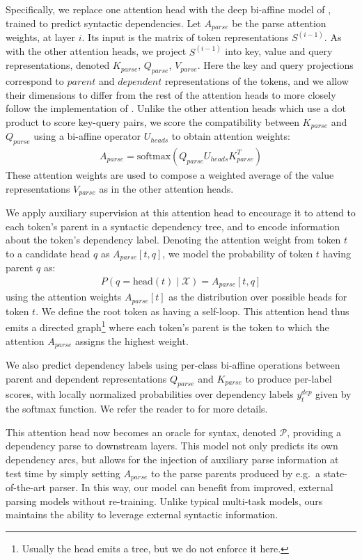 \documentclass[11pt,a4paper]{article}
\begin{document}
Specifically, we replace one attention head with the deep bi-affine model of \citet{dozat2017deep}, trained to predict syntactic dependencies. Let $A_{parse}$ be the parse attention weights, at layer $i$. Its input is the matrix of token representations $S^{(i-1)}$. As with the other attention heads, we project $S^{(i-1)}$ into key, value and query representations, denoted $K_{parse}$, $Q_{parse}$, $V_{parse}$. Here the key and query projections correspond to $parent$ and $dependent$ representations of the tokens, and we allow their dimensions to differ from the rest of the attention heads to more closely follow the implementation of \citet{dozat2017deep}. Unlike the other attention heads which use a dot product to score key-query pairs, we score the compatibility between $K_{parse}$ and $Q_{parse}$ using a bi-affine operator $U_{heads}$ to obtain attention weights:
\begin{align}
A_{parse} = \mathrm{softmax}(Q_{parse} U_{heads} K_{parse}^T)
\end{align}
These attention weights are used to compose a weighted average of the value representations $V_{parse}$ as in the other attention heads.

We apply auxiliary supervision at this attention head to encourage it to attend to each token's parent in a syntactic dependency tree, and to encode information about the token's dependency label. Denoting the attention weight from token $t$ to a candidate head $q$ as $A_{parse}[t,q]$, we model the probability of token $t$ having parent $q$ as:
\begin{align}
P(q=\mathrm{head}(t) \mid \mathcal{X}) = A_{parse}[t, q]
\end{align}
using the attention weights $A_{parse}[t]$ as the distribution over possible heads for token $t$. We define the root token as having a self-loop. This attention head thus emits a directed graph\footnote{Usually the head emits a tree, but we do not enforce it here.} where each token's parent is the token to which the attention $A_{parse}$ assigns the highest weight. 

We also predict dependency labels using per-class bi-affine operations between parent and dependent representations $Q_{parse}$ and $K_{parse}$ to produce per-label scores, with locally normalized probabilities over dependency labels $y_t^{dep}$ given by the softmax function. We refer the reader to \citet{dozat2017deep} for more details.

This attention head now becomes an oracle for syntax, denoted $\mathcal{P}$, providing a dependency parse to downstream layers. This model not only predicts its own dependency arcs, but allows for the injection of auxiliary parse information at test time by simply setting $A_{parse}$ to the parse parents produced by e.g.\ a state-of-the-art parser. In this way, our model can benefit from improved, external parsing models without re-training.
Unlike typical multi-task models, ours maintains the ability to leverage external syntactic information.
\end{document}
